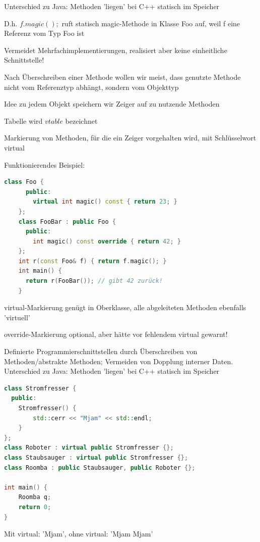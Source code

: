 \documentclass[10pt]{article}
\begin{document}
\begin{itemize*}
  \item Unterschied zu Java: Methoden 'liegen' bei C++ statisch im Speicher
  \begin{itemize*}
    \item D.h. $f.magic();$ ruft statisch magic-Methode in Klasse Foo auf, weil f eine Referenz vom Typ Foo ist
    \item Vermeidet Mehrfachimplementierungen, realisiert aber keine einheitliche Schnittstelle!
  \end{itemize*}
  \item Nach Überschreiben einer Methode wollen wir meist, dass genutzte Methode nicht vom Referenztyp abhängt, sondern vom Objekttyp
  \begin{itemize*}
    \item Idee zu jedem Objekt speichern wir Zeiger auf zu nutzende Methoden
    \item Tabelle wird $vtable$ bezeichnet
    \item Markierung von Methoden, für die ein Zeiger vorgehalten wird, mit Schlüsselwort virtual
    \item Funktionierendes Beispiel:
    \begin{lstlisting}[language=C++]
    class Foo {
      public:
        virtual int magic() const { return 23; }
    };
    class FooBar : public Foo {
      public:
        int magic() const override { return 42; }
    };
    int r(const Foo& f) { return f.magic(); }
    int main() {
      return r(FooBar()); // gibt 42 zurück!
    }
    \end{lstlisting}
    \item virtual-Markierung genügt in Oberklasse, alle abgeleiteten Methoden ebenfalls 'virtuell'
    \item override-Markierung optional, aber hätte vor fehlendem virtual gewarnt!
  \end{itemize*}
\end{itemize*}

Definierte Programmierschnittstellen durch Überschreiben von Methoden/abstrakte Methoden; Vermeiden von Dopplung interner Daten.
Unterschied zu Java: Methoden 'liegen' bei C++ statisch im Speicher

\begin{lstlisting}[language=C++]
class Stromfresser {
  public:
    Stromfresser() {
        std::cerr << "Mjam" << std::endl;
    }
};
class Roboter : virtual public Stromfresser {};
class Staubsauger : virtual public Stromfresser {};
class Roomba : public Staubsauger, public Roboter {};

int main() {
    Roomba q;
    return 0;
}
\end{lstlisting}
Mit virtual: 'Mjam', ohne virtual: 'Mjam Mjam'
\end{document}
